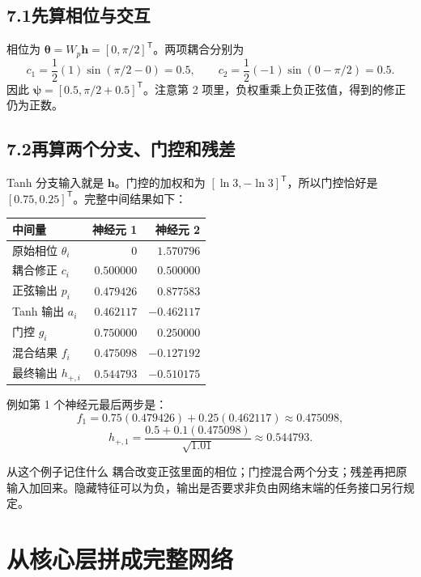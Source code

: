 \documentclass[UTF8,11pt,a4paper,fontset=fandol]{ctexart}
\newcommand{\newsection}[1]{\clearpage\section{#1}}
\begin{document}
\subsection*{7.1\quad 先算相位与交互}
相位为 $\boldsymbol{\theta}=W_p\boldsymbol{h}=[0,\pi/2]^{\mathsf T}$。两项耦合分别为
\[
 c_1=\frac12(1)\sin(\pi/2-0)=0.5,\qquad
 c_2=\frac12(-1)\sin(0-\pi/2)=0.5.
\]
因此 $\boldsymbol{\psi}=[0.5,\pi/2+0.5]^{\mathsf T}$。注意第 2 项里，负权重乘上负正弦值，得到的修正仍为正数。
\subsection*{7.2\quad 再算两个分支、门控和残差}
Tanh 分支输入就是 $\boldsymbol{h}$。门控的加权和为 $[\ln3,-\ln3]^{\mathsf T}$，所以门控恰好是 $[0.75,0.25]^{\mathsf T}$。完整中间结果如下：
\begin{center}
\par\smallskip\noindent\begin{tabularx}{\linewidth}{@{}Yrr@{}}
\toprule
\textbf{中间量}&\textbf{神经元 1}&\textbf{神经元 2}\\\midrule
原始相位 $\theta_i$&$0$&$1.570796$\\
耦合修正 $c_i$&$0.500000$&$0.500000$\\
正弦输出 $p_i$&$0.479426$&$0.877583$\\
Tanh 输出 $a_i$&$0.462117$&$-0.462117$\\
门控 $g_i$&$0.750000$&$0.250000$\\
混合结果 $f_i$&$0.475098$&$-0.127192$\\
最终输出 $h_{+,i}$&$0.544793$&$-0.510175$\\\bottomrule
\end{tabularx}\par\smallskip
\end{center}
例如第 1 个神经元最后两步是：
\[
f_1=0.75(0.479426)+0.25(0.462117)\approx0.475098,
\]
\[
h_{+,1}=\frac{0.5+0.1(0.475098)}{\sqrt{1.01}}\approx0.544793.
\]
\begin{explain}{从这个例子记住什么}
耦合改变正弦里面的相位；门控混合两个分支；残差再把原输入加回来。隐藏特征可以为负，输出是否要求非负由网络末端的任务接口另行规定。
\end{explain}

\newsection{从核心层拼成完整网络}
\end{document}
